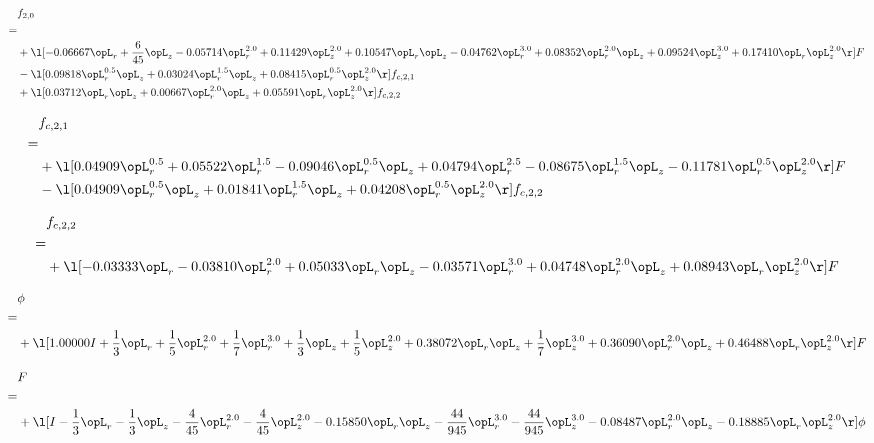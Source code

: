 \begin{alignat}{2} 
\label{eq:f_20_2} 
& f_{2,0} \nonumber \\ 
 = \\ 
& + \l[  -0.06667 \opL_r + \frac{6}{45} \opL_z   -0.05714 \opL_r^{2.0} +  0.11429 \opL_z^{2.0} +  0.10547 \opL_r \opL_z   -0.04762 \opL_r^{3.0} +  0.08352 \opL_r^{2.0} \opL_z +  0.09524 \opL_z^{3.0} +  0.17410 \opL_r \opL_z^{2.0}  \r] F \nonumber \\ 
& - \l[  0.09818 \opL_r^{0.5} \opL_z +  0.03024 \opL_r^{1.5} \opL_z +  0.08415 \opL_r^{0.5} \opL_z^{2.0}  \r] f_{c,2,1} \nonumber \\ 
& + \l[  0.03712 \opL_r \opL_z +  0.00667 \opL_r^{2.0} \opL_z +  0.05591 \opL_r \opL_z^{2.0}  \r] f_{c,2,2} \nonumber \\ 
\end{alignat} 


\begin{alignat}{2} 
\label{eq:f_21_2} 
& f_{c,2,1} \nonumber \\ 
 = \\ 
& + \l[  0.04909 \opL_r^{0.5} +  0.05522 \opL_r^{1.5}   -0.09046 \opL_r^{0.5} \opL_z +  0.04794 \opL_r^{2.5}   -0.08675 \opL_r^{1.5} \opL_z   -0.11781 \opL_r^{0.5} \opL_z^{2.0}  \r] F \nonumber \\ 
& - \l[  0.04909 \opL_r^{0.5} \opL_z +  0.01841 \opL_r^{1.5} \opL_z +  0.04208 \opL_r^{0.5} \opL_z^{2.0}  \r] f_{c,2,2} \nonumber \\ 
\end{alignat} 


\begin{alignat}{2} 
\label{eq:f_22_2} 
& f_{c,2,2} \nonumber \\ 
 = \\ 
& + \l[  -0.03333 \opL_r   -0.03810 \opL_r^{2.0} +  0.05033 \opL_r \opL_z   -0.03571 \opL_r^{3.0} +  0.04748 \opL_r^{2.0} \opL_z +  0.08943 \opL_r \opL_z^{2.0}  \r] F \nonumber \\ 
\end{alignat} 


\begin{alignat}{2} 
\label{eq:scalarFlux_1} 
& \phi \nonumber \\ 
 = \\ 
& + \l[  1.00000 I + \frac{1}{3} \opL_r + \frac{1}{5} \opL_r^{2.0} + \frac{1}{7} \opL_r^{3.0} + \frac{1}{3} \opL_z + \frac{1}{5} \opL_z^{2.0} +  0.38072 \opL_r \opL_z + \frac{1}{7} \opL_z^{3.0} +  0.36090 \opL_r^{2.0} \opL_z +  0.46488 \opL_r \opL_z^{2.0}  \r] F \nonumber \\ 
\end{alignat} 


\begin{alignat}{2} 
\label{eq:transport3D_0} 
& F \nonumber \\ 
 = \\ 
& + \l[ I - \frac{1}{3} \opL_r - \frac{1}{3} \opL_z - \frac{4}{45} \opL_r^{2.0} - \frac{4}{45} \opL_z^{2.0}   -0.15850 \opL_r \opL_z - \frac{44}{945} \opL_r^{3.0} - \frac{44}{945} \opL_z^{3.0}   -0.08487 \opL_r^{2.0} \opL_z   -0.18885 \opL_r \opL_z^{2.0}  \r] \phi \nonumber \\ 
\end{alignat} 


